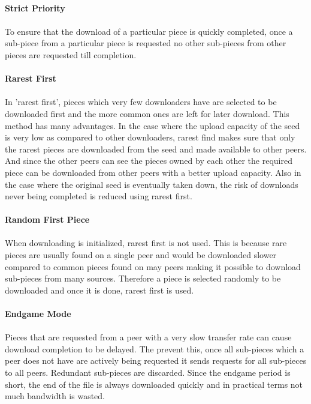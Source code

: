 \documentclass[24 pts]{article}
\begin{document}
\paragraph{Strict Priority}\paragraph{}
To ensure that the download of a particular piece is quickly completed, once a  sub-piece from a particular piece is requested no other sub-pieces from other pieces are requested till completion.

\paragraph{Rarest First}\paragraph{}
In 'rarest first', pieces which very few downloaders have are selected to be downloaded first and the more common ones are left for later download. This method has many advantages. In the case where the upload capacity of the seed is very low as compared to other downloaders, rarest find makes sure that only the rarest pieces are downloaded from the seed and made available to other peers. And since the other peers can see the pieces owned by each other the required piece can be downloaded from other peers with a better upload capacity. Also in the case where the original seed is eventually taken down, the risk of downloads never being completed is reduced using rarest first.

\paragraph{Random First Piece}\paragraph{}
When downloading is initialized, rarest first is not used. This is because rare pieces are usually found on a single peer and would be downloaded slower compared to common pieces found on may peers making it possible to download sub-pieces from many sources. Therefore a piece is selected randomly to be downloaded and once it is done, rarest first is used.

\paragraph{Endgame Mode}\paragraph{}
Pieces that are requested from a peer with a very slow transfer rate can cause download completion to be delayed. The prevent this, once all sub-pieces which a peer does not have are actively being requested it sends requests for all sub-pieces to all peers. Redundant sub-pieces are discarded. Since the endgame period is short, the end of the file is always downloaded quickly and in practical terms not much bandwidth is wasted.
\end{document}
